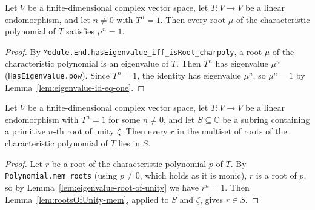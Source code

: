 \begin{lemma}
    \label{lem:eigenvalue-root-of-unity}
    \leanok
    Let $V$ be a finite-dimensional complex vector space, let $T : V \to V$ be a
    linear endomorphism, and let $n \neq 0$ with $T^n = 1$. Then every root $\mu$
    of the characteristic polynomial of $T$ satisfies $\mu^n = 1$.
\end{lemma}
\begin{proof}
    By \texttt{Module.End.hasEigenvalue\_iff\_isRoot\_charpoly}, a root $\mu$ of
    the characteristic polynomial is an eigenvalue of $T$. Then $T^n$ has
    eigenvalue $\mu^n$ (\texttt{HasEigenvalue.pow}). Since $T^n = 1$, the identity
    has eigenvalue $\mu^n$, so $\mu^n = 1$ by
    Lemma~\ref{lem:eigenvalue-id-eq-one}.
\end{proof}

\begin{lemma}
    \label{lem:charpoly-roots-mem-range}
    \leanok
    Let $V$ be a finite-dimensional complex vector space, let $T : V \to V$ be a
    linear endomorphism with $T^n = 1$ for some $n \neq 0$, and let
    $S \subseteq \mathbb{C}$ be a subring containing a primitive $n$-th root of
    unity $\zeta$. Then every $r$ in the multiset of roots of the characteristic
    polynomial of $T$ lies in $S$.
\end{lemma}
\begin{proof}
    Let $r$ be a root of the characteristic polynomial $p$ of $T$. By
    \texttt{Polynomial.mem\_roots} (using $p \neq 0$, which holds as it is monic),
    $r$ is a root of $p$, so by Lemma~\ref{lem:eigenvalue-root-of-unity} we have
    $r^n = 1$. Then Lemma~\ref{lem:rootsOfUnity-mem}, applied to $S$ and $\zeta$,
    gives $r \in S$.
\end{proof}

